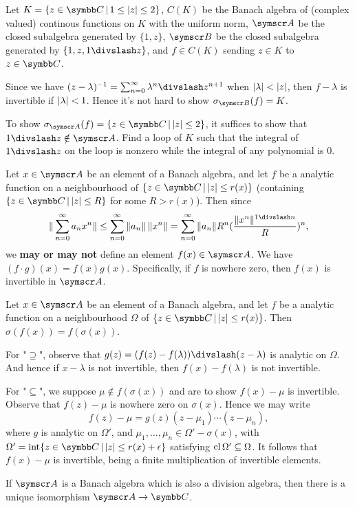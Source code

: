 \begin{example}
  Let $K = \{z\in\CC\VERT 1\leq\ABS{z}\leq 2\}$, $C(K)$ be the Banach algebra of (complex valued) continous functions on $K$ with the uniform norm, $\BA A$ be the closed subalgebra generated by $\{1, z\}$, $\BA B$ be the closed subalgebra generated by $\{1, z, 1\DIV z\}$, and $f\in C(K)$ sending $z\in K$ to $z\in\CC$.

  Since we have $(z-\lambda)^{-1}=\sum_{n=0}^\infty \lambda^n\DIV z^{n+1}$ when $\vert\lambda\vert<\vert z\vert$, then $f-\lambda$ is invertible if $\vert\lambda\vert < 1$. Hence it's not hard to show $\sigma_{\BA B}(f)=K$.

  To show $\sigma_{\BA A}(f)=\{z\in\CC\VERT \ABS{z}\leq 2\}$, it suffices to show that $1\DIV z\notin \BA A$. Find a loop of $K$ such that the integral of $1\DIV z$ on the loop is nonzero while the integral of any polynomial is 0.
\end{example}

Let $x\in \BA A$ be an element of a Banach algebra, and let $f$ be a analytic function on a neighbourhood of $\{z\in\CC\VERT \ABS{z}\leq r(x)\}$ (containing $\{z\in\CC\VERT \ABS{z}\leq R\}$ for some $R>r(x)$). Then since
\begin{equation*}
  \NORM{\sum_{n=0}^\infty a_nx^n}\leq\sum_{n=0}^\infty\NORM{a_n}\,\NORM{x^n}=\sum_{n=0}^\infty \NORM{a_n}R^n(\frac{\NORM{x^n}^{1\DIV n}}{R})^n,
\end{equation*}
we {\bf may or may not} define an element $f(x)\in \BA A$. We have $(f\cdot g)(x)=f(x)g(x)$. Specifically, if $f$ is nowhere zero, then $f(x)$ is invertible in $\BA A$.

\begin{theorem}
  Let $x\in \BA A$ be an element of a Banach algebra, and let $f$ be a analytic function on a neighbourhood $\Omega$ of $\{z\in\CC\VERT \ABS{z}\leq r(x)\}$. Then $\sigma(f(x))=f(\sigma(x))$.
\end{theorem}

\begin{sketch}
  For "$\supseteq$", observe that $g(z)=(f(z)-f(\lambda))\DIV (z-\lambda)$ is analytic on $\Omega$. And hence if $x-\lambda$ is not invertible, then $f(x)-f(\lambda)$ is not invertible.

  For "$\subseteq$", we suppose $\mu\notin f(\sigma(x))$ and are to show $f(x)-\mu$ is invertible. Observe that $f(z)-\mu$ is nowhere zero on $\sigma(x)$. Hence we may write
  \begin{equation*}
    f(z)-\mu=g(z)(z-\mu_1)\dotsb(z-\mu_n),
  \end{equation*}
  where $g$ is analytic on $\Omega'$, and $\mu_1, \dotsc, \mu_n\in\Omega'-\sigma(x)$, with $\Omega'=\INT \{z\in\CC\VERT \ABS{z}\leq r(x)+\epsilon\}$ satisfying $\operatorname{cl}\Omega'\subseteq\Omega$. It follows that $f(x)-\mu$ is invertible, being a finite multiplication of invertible elements.
\end{sketch}

\begin{theorem}
  If $\BA A$ is a Banach algebra which is also a division algebra, then there is a unique isomorphism $\BA A\to \CC$.
\end{theorem}
